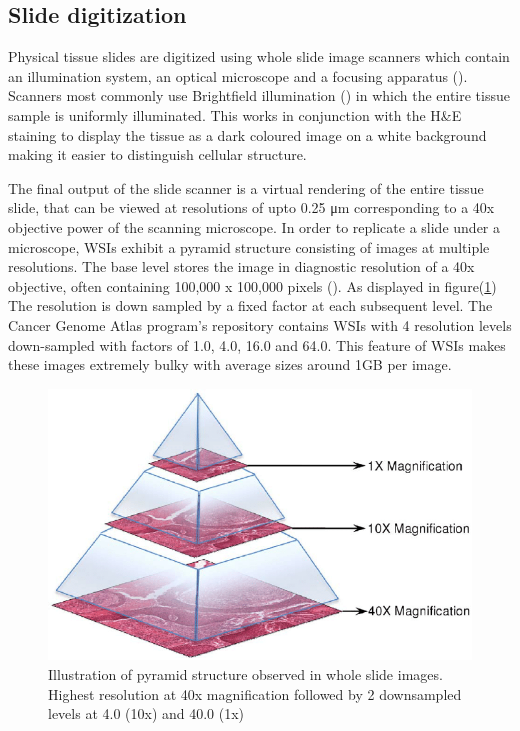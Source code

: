 \documentclass{l4proj}
\begin{document}
\subsection{Slide digitization}
Physical tissue slides are digitized using whole slide image scanners which contain an illumination system, an optical microscope and a focusing apparatus (\textit{\cite{ghaznavi2013digital}}). Scanners most commonly use Brightfield illumination (\textit{\cite{kino1996confocal}}) in which the entire tissue sample is uniformly illuminated. This works in conjunction with the H\&E staining to display the tissue as a dark coloured image on a white background making it easier to distinguish cellular structure. 

The final output of the slide scanner is a virtual rendering of the entire tissue slide, that can be viewed at resolutions of upto 0.25 \si{\micro\meter} corresponding to a 40x objective power of the scanning microscope. In order to replicate a slide under a microscope, WSIs exhibit a pyramid structure consisting of images at multiple resolutions. The base level stores the image in diagnostic resolution of a 40x objective, often containing 100,000 x 100,000 pixels (\textit{\cite{wang2012managing}}). As displayed in figure(\ref{fig:pyramid-fig}) The resolution is down sampled by a fixed factor at each subsequent level. The Cancer Genome Atlas program's repository contains WSIs with 4 resolution levels down-sampled with factors of 1.0, 4.0, 16.0 and 64.0. This feature of WSIs makes these images extremely bulky with average sizes around 1GB per image. 

\begin{figure}[h]
\centering
\includegraphics[scale=0.5]{images/digital-slide-stored-in-a-pyramid-structure.png}
\caption{Illustration of pyramid structure observed in whole slide images. Highest resolution at 40x magnification followed by 2 downsampled levels at 4.0 (10x) and 40.0 (1x)}
\label{fig:pyramid-fig}
\end{figure}
\end{document}
